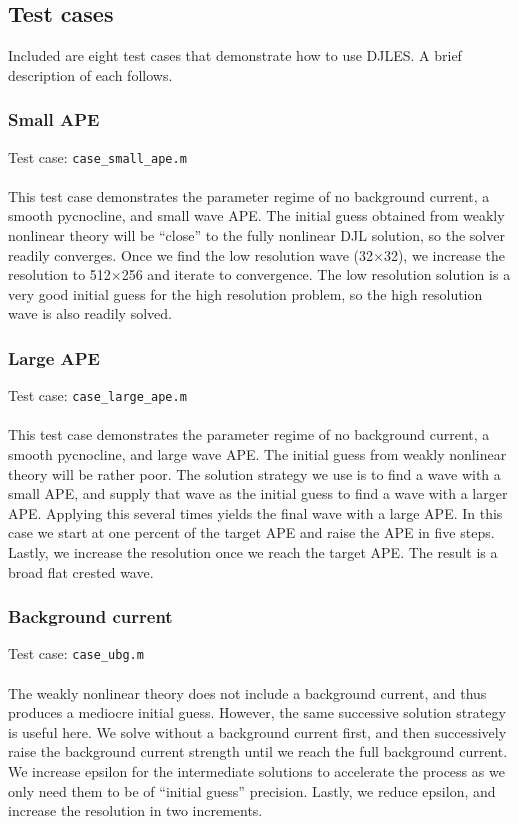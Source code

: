 \documentclass[letterpaper]{article}
\begin{document}
\subsection{Test cases}
Included are eight test cases that demonstrate how to use DJLES. A brief description of each follows.

\subsubsection{Small APE}
Test case: \verb"case_small_ape.m" \\\\
This test case demonstrates the parameter regime of no background current, a smooth pycnocline, and small wave APE.
The initial guess obtained from weakly nonlinear theory will be ``close'' to the fully nonlinear DJL solution, so the solver readily converges.
Once we find the low resolution wave (32$\times$32), we increase the resolution to 512$\times$256 and iterate to convergence.
The low resolution solution is a very good initial guess for the high resolution problem, so the high resolution wave is also readily solved.

\subsubsection{Large APE}
Test case: \verb"case_large_ape.m" \\\\
This test case demonstrates the parameter regime of no background current, a smooth pycnocline, and large wave APE.
The initial guess from weakly nonlinear theory will be rather poor. 
The solution strategy we use is to find a wave with a small APE, and supply that wave as the initial guess to find a wave with a larger APE.
Applying this several times yields the final wave with a large APE.
In this case we start at one percent of the target APE and raise the APE in five steps.
Lastly, we increase the resolution once we reach the target APE.
The result is a broad flat crested wave.

\subsubsection{Background current}
Test case: \verb"case_ubg.m" \\\\
The weakly nonlinear theory does not include a background current, and thus produces a mediocre initial guess.
However, the same successive solution strategy is useful here.
We solve without a background current first, and then successively raise the background current strength until we reach the full background current.
We increase epsilon for the intermediate solutions to accelerate the process as we only need them to be of ``initial guess'' precision.
Lastly, we reduce epsilon, and increase the resolution in two increments.
\end{document}
